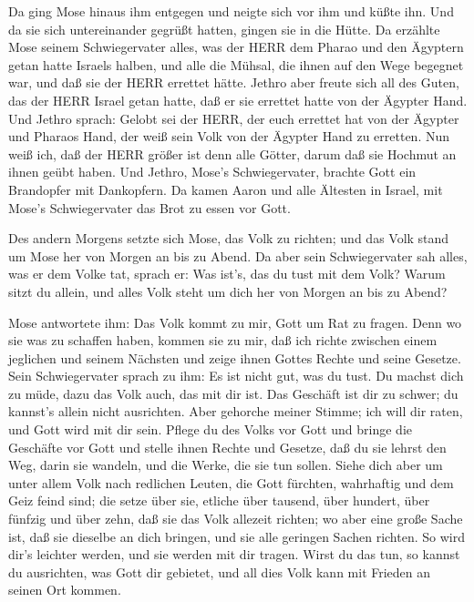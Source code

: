  Da ging Mose hinaus ihm entgegen und neigte sich vor ihm
und küßte ihn. Und da sie sich untereinander gegrüßt hatten, gingen sie
in die Hütte.  Da erzählte Mose seinem Schwiegervater alles,
was der HERR dem Pharao und den Ägyptern getan hatte Israels halben, und
alle die Mühsal, die ihnen auf den Wege begegnet war, und daß sie der
HERR errettet hätte.  Jethro aber freute sich all des Guten,
das der HERR Israel getan hatte, daß er sie errettet hatte von der
Ägypter Hand.  Und Jethro sprach: Gelobt sei der HERR, der
euch errettet hat von der Ägypter und Pharaos Hand, der weiß sein Volk
von der Ägypter Hand zu erretten.  Nun weiß ich, daß der
HERR größer ist denn alle Götter, darum daß sie Hochmut an ihnen geübt
haben.  Und Jethro, Mose's Schwiegervater, brachte Gott ein
Brandopfer mit Dankopfern. Da kamen Aaron und alle Ältesten in Israel,
mit Mose's Schwiegervater das Brot zu essen vor Gott.

 Des andern Morgens setzte sich Mose, das Volk zu richten;
und das Volk stand um Mose her von Morgen an bis zu Abend. 
Da aber sein Schwiegervater sah alles, was er dem Volke tat, sprach er:
Was ist's, das du tust mit dem Volk? Warum sitzt du allein, und alles
Volk steht um dich her von Morgen an bis zu Abend?

 Mose antwortete ihm: Das Volk kommt zu mir, Gott um Rat zu
fragen.  Denn wo sie was zu schaffen haben, kommen sie zu
mir, daß ich richte zwischen einem jeglichen und seinem Nächsten und
zeige ihnen Gottes Rechte und seine Gesetze.  Sein
Schwiegervater sprach zu ihm: Es ist nicht gut, was du tust.
 Du machst dich zu müde, dazu das Volk auch, das mit dir
ist. Das Geschäft ist dir zu schwer; du kannst's allein nicht
ausrichten.  Aber gehorche meiner Stimme; ich will dir
raten, und Gott wird mit dir sein. Pflege du des Volks vor Gott und
bringe die Geschäfte vor Gott  und stelle ihnen Rechte und
Gesetze, daß du sie lehrst den Weg, darin sie wandeln, und die Werke,
die sie tun sollen.  Siehe dich aber um unter allem Volk
nach redlichen Leuten, die Gott fürchten, wahrhaftig und dem Geiz feind
sind; die setze über sie, etliche über tausend, über hundert, über
fünfzig und über zehn,  daß sie das Volk allezeit richten;
wo aber eine große Sache ist, daß sie dieselbe an dich bringen, und sie
alle geringen Sachen richten. So wird dir's leichter werden, und sie
werden mit dir tragen.  Wirst du das tun, so kannst du
ausrichten, was Gott dir gebietet, und all dies Volk kann mit Frieden an
seinen Ort kommen.

